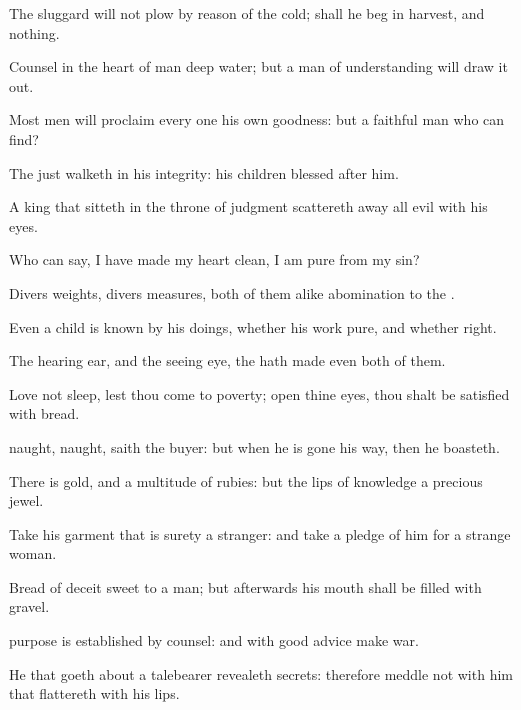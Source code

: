 {The
sluggard will not
plow by reason of the
cold;
{} shall he
beg in
harvest, and
{} nothing.

Counsel in the
heart of
man
{}
deep
water; but a
man of
understanding will draw it
out.

Most
men will
proclaim every
one his own
goodness: but a
faithful
man who can
find?

The
just
{}
walketh in his
integrity: his
children
{}
blessed
after him.

A
king that sitteth
in the
throne of
judgment scattereth
away all
evil with his
eyes.

Who can
say, I have made my
heart
clean, I am
pure from my
sin?

Divers
weights,
{} divers
measures,
both of them
{}
alike
abomination to the
{}.

Even a
child is
known by his
doings, whether his
work
{}
pure, and whether
{}
right.

The
hearing
ear, and the
seeing
eye, the
{} hath
made even
both of them.

Love not
sleep, lest thou come to
poverty;
open thine
eyes,
{} thou shalt be
satisfied with
bread.

naught,
{}
naught,
saith the
buyer: but when he is
gone his way, then he
boasteth.

There
is
gold, and a
multitude of
rubies: but the
lips of
knowledge
{} a
precious
jewel.

Take his
garment that is
surety
{} a
stranger: and take a
pledge of him for a strange
woman.

Bread of
deceit
{}
sweet to a
man; but
afterwards his
mouth shall be
filled with
gravel.

purpose is
established by
counsel: and with good
advice
make
war.

He that goeth
about
{} a
talebearer
revealeth
secrets: therefore
meddle not with him that
flattereth with his
lips.

}
